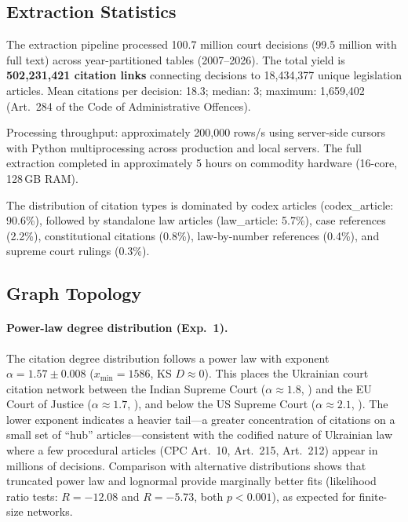 \documentclass[11pt]{article}
\begin{document}

\subsection{Extraction Statistics}
\label{sec:extraction-results}

The extraction pipeline processed 100.7 million court decisions (99.5 million with full text) across year-partitioned tables (2007--2026).
The total yield is \textbf{502,231,421 citation links} connecting decisions to 18,434,377 unique legislation articles.
Mean citations per decision: 18.3; median: 3; maximum: 1,659,402 (Art.~284 of the Code of Administrative Offences).

Processing throughput: approximately 200,000 rows/s using server-side cursors with Python multiprocessing across production and local servers.
The full extraction completed in approximately 5 hours on commodity hardware (16-core, 128\,GB RAM).

The distribution of citation types is dominated by codex articles (codex\_article: 90.6\%), followed by standalone law articles (law\_article: 5.7\%), case references (2.2\%), constitutional citations (0.8\%), law-by-number references (0.4\%), and supreme court rulings (0.3\%).

\subsection{Graph Topology}
\label{sec:topology}

\paragraph{Power-law degree distribution (Exp.~1).}
The citation degree distribution follows a power law with exponent $\alpha = 1.57 \pm 0.008$ ($x_{\min} = 1586$, KS $D \approx 0$).
This places the Ukrainian court citation network between the Indian Supreme Court ($\alpha \approx 1.8$, \citealt{kumar2013}) and the EU Court of Justice ($\alpha \approx 1.7$, \citealt{mirshahvalad2012}), and below the US Supreme Court ($\alpha \approx 2.1$, \citealt{fowler2007network}).
The lower exponent indicates a heavier tail---a greater concentration of citations on a small set of ``hub'' articles---consistent with the codified nature of Ukrainian law where a few procedural articles (CPC Art.~10, Art.~215, Art.~212) appear in millions of decisions.
Comparison with alternative distributions shows that truncated power law and lognormal provide marginally better fits (likelihood ratio tests: $R = -12.08$ and $R = -5.73$, both $p < 0.001$), as expected for finite-size networks.
\end{document}

